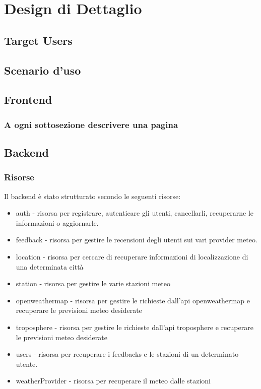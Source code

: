 \chapter{Design di Dettaglio}
\section{Target Users}
\section{Scenario d'uso}
\section{Frontend}
\subsection{A ogni sottosezione descrivere una pagina}
\section{Backend}
\subsection{Risorse}
Il backend è stato strutturato secondo le seguenti risorse:
\begin{itemize}
\item auth - risorsa per registrare, autenticare gli utenti, cancellarli, recuperarne le
informazioni o aggiornarle.
\item feedback - risorsa per gestire le recensioni degli utenti sui vari provider meteo.
\item location - risorsa per cercare di recuperare informazioni di localizzazione di una determinata città
\item station - risorsa per gestire le varie stazioni meteo

\item openweathermap - risorsa per gestire le richieste dall'api openweathermap e recuperare le previsioni meteo desiderate
\item troposphere - risorsa per gestire le richieste dall'api troposphere e recuperare le previsioni meteo desiderate
\item users - risorsa per recuperare i feedbacks e le stazioni di un determinato utente.
\item weatherProvider - risorsa per recuperare il meteo dalle stazioni
\end{itemize}
